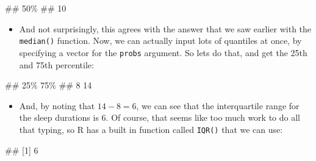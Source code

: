 \documentclass[
]{book}
\newenvironment{Shaded}{\begin{snugshade}}{\end{snugshade}}
\newcommand{\AttributeTok}[1]{\textcolor[rgb]{0.13,0.29,0.53}{#1}}
\newcommand{\DecValTok}[1]{\textcolor[rgb]{0.00,0.00,0.81}{#1}}
\newcommand{\FunctionTok}[1]{\textcolor[rgb]{0.13,0.29,0.53}{\textbf{#1}}}
\newcommand{\NormalTok}[1]{#1}
\newcommand{\SpecialCharTok}[1]{\textcolor[rgb]{0.81,0.36,0.00}{\textbf{#1}}}
\providecommand{\tightlist}{%
  \setlength{\itemsep}{0pt}\setlength{\parskip}{0pt}}
\begin{document}
\begin{Shaded}
\begin{Highlighting}[]
\NormalTok{\#\# 50\% }
\NormalTok{\#\#  10}
\end{Highlighting}
\end{Shaded}

\begin{itemize}
\tightlist
\item
  And not surprisingly, this agrees with the answer that we saw earlier with the \texttt{median()} function. Now, we can actually input lots of quantiles at once, by specifying a vector for the \texttt{probs} argument. So lets do that, and get the 25th and 75th percentile:
\end{itemize}

\begin{Shaded}
\end{Shaded}

\begin{Shaded}
\begin{Highlighting}[]
\NormalTok{\#\# 25\% 75\% }
\NormalTok{\#\#   8  14}
\end{Highlighting}
\end{Shaded}

\begin{itemize}
\tightlist
\item
  And, by noting that \(14 - 8 = 6\), we can see that the interquartile range for the sleep durations is 6. Of course, that seems like too much work to do all that typing, so R has a built in function called \texttt{IQR()} that we can use:
\end{itemize}

\begin{Shaded}
\end{Shaded}

\begin{Shaded}
\begin{Highlighting}[]
\NormalTok{\#\# [1] 6}
\end{Highlighting}
\end{Shaded}
\end{document}
